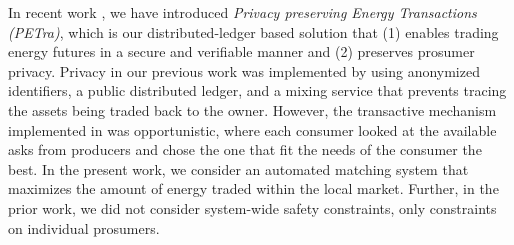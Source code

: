 In recent work \cite{Laszka17}, we have introduced {\it Privacy preserving Energy Transactions
(PETra)}, which is our distributed-ledger based solution that
(1) enables trading energy futures in a secure and verifiable
manner and (2) preserves prosumer privacy. 
Privacy in our previous work was implemented by using anonymized identifiers, a public distributed ledger, and a mixing service that prevents tracing the assets being traded back to the owner.
However, the transactive mechanism implemented in \cite{Laszka17} was opportunistic, where each consumer looked at the available asks from producers and chose the one that fit the needs of the consumer the best. In the present work, we consider an automated matching system that maximizes the amount of energy traded within the local market. Further, in the prior work, we did not consider system-wide safety constraints, only constraints on individual prosumers.



